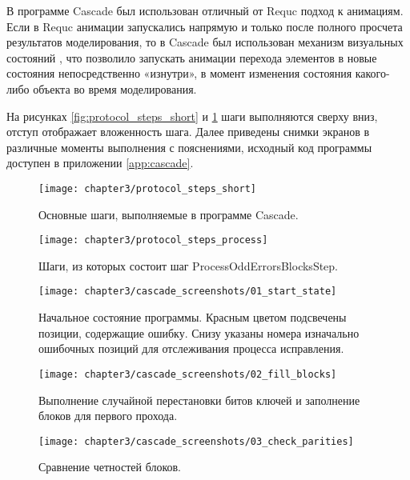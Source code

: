 В программе Cascade был использован отличный от Requc подход к анимациям. Если в Requc анимации запускались напрямую и только после полного просчета результатов моделирования, то в Cascade был использован механизм визуальных состояний \cite{visual_state_manager}, что позволило запускать анимации перехода элементов в новые состояния непосредственно «изнутри», в момент изменения состояния какого-либо объекта во время моделирования.

На рисунках \ref{fig:protocol_steps_short} и \ref{fig:protocol_steps_process} шаги выполняются сверху вниз, отступ отображает вложенность шага. Далее приведены снимки экранов в различные моменты выполнения с пояснениями, исходный код программы доступен в приложении \ref{app:cascade}.

\begin{figure}[h]
\begin{center}
  \begin{minipage}[h]{0.4\linewidth}
    \texttt{[image: chapter3/protocol\_steps\_short]}
    \caption{Основные шаги, выполняемые в программе Cascade.}
    \label{fig:protocol_steps_short}
  \end{minipage}
  \hfill 
  \begin{minipage}[h]{0.4\linewidth}
    \texttt{[image: chapter3/protocol\_steps\_process]}
    \caption{Шаги, из которых состоит шаг ProcessOddErrorsBlocksStep.}
    \label{fig:protocol_steps_process}
  \end{minipage}
\end{center}  
\end{figure}

\FloatBarrier
\begin{figure}[h]
  \texttt{[image: chapter3/cascade\_screenshots/01\_start\_state]}
  \caption{Начальное состояние программы. Красным цветом подсвечены позиции, содержащие ошибку. Снизу указаны номера изначально ошибочных позиций для отслеживания процесса исправления.}
\end{figure}

\begin{figure}[h]
  \texttt{[image: chapter3/cascade\_screenshots/02\_fill\_blocks]}
  \caption{Выполнение случайной перестановки битов ключей и заполнение блоков для первого прохода.}
\end{figure}

\begin{figure}[h]
  \texttt{[image: chapter3/cascade\_screenshots/03\_check\_parities]}
  \caption{Сравнение четностей блоков.}
\end{figure}

